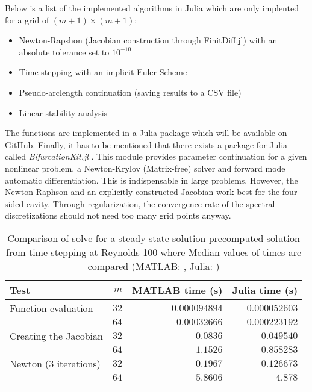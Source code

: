 Below is a list of the implemented algorithms in Julia which are only implented
for a grid of $(m+1) \times (m+1)$:

\begin{itemize}
  \item Newton-Rapshon (Jacobian construction through FinitDiff.jl) with an absolute tolerance
    set to $10^{-10}$
  \item Time-stepping with an implicit Euler Scheme
  \item Pseudo-arclength continuation (saving results to a CSV file)
  \item Linear stability analysis
\end{itemize}

The functions are implemented in a Julia package which will be available on
GitHub. Finally, it has to be mentioned that there exists a package for Julia
called \emph{BifurcationKit.jl} \citep{veltz2020}. This module provides
parameter continuation for a given nonlinear problem, a Newton-Krylov
(Matrix-free) solver and forward mode automatic differentiation. This is
indispensable in large problems. However, the Newton-Raphson and an explicitly
constructed Jacobian work best for the four-sided cavity. Through
regularization, the convergence rate of the spectral discretizations should not
need too many grid points anyway.

\begin{table}[ht]
  \caption{Comparison of solve for a steady state solution precomputed solution 
    from time-stepping at Reynolds 100 where Median values of times are compared
  (MATLAB: , Julia: )}
  \label{tab:matlab_julia}
\begin{tabular}{lrrr}
Test & $m$ & MATLAB time (s) & Julia time (s) \\
\hline
Function evaluation  & $32$ & $0.000094894$  & $0.000052603$ \\
& $64$ & $0.00032666$ & $0.000223192$ \\
 Creating the Jacobian  & $32$ & $0.0836$  &  $0.049540$  \\
& $64$ & $1.1526$ & $0.858283$ \\
Newton (3 iterations)  & $32$ & $0.1967$ & $0.126673$ \\
& $64$ & $5.8606$  & $4.878$ \\
\label{tab:comp}
\end{tabular}
\end{table}


